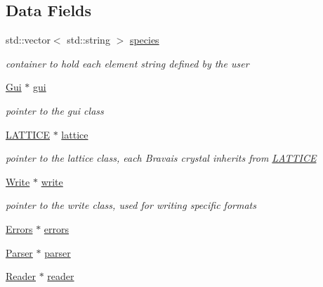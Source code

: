 \subsection*{Data Fields}
\begin{DoxyCompactItemize}
\item 
std\+::vector$<$ std\+::string $>$ \hyperlink{class_i_n_t_e_r_f_a_c_e_aa55e1e42a1d2309638398bb640fbf74f}{species}
\begin{DoxyCompactList}\small\item\em container to hold each element string defined by the user \end{DoxyCompactList}\item 
\hyperlink{class_gui}{Gui} $\ast$ \hyperlink{class_i_n_t_e_r_f_a_c_e_a194a3b0540d87580158795d6a15d916e}{gui}
\begin{DoxyCompactList}\small\item\em pointer to the gui class \end{DoxyCompactList}\item 
\hyperlink{class_l_a_t_t_i_c_e}{L\+A\+T\+T\+I\+C\+E} $\ast$ \hyperlink{class_i_n_t_e_r_f_a_c_e_a5e07ee2e9ab4f84a9a6ae25c023dc24b}{lattice}
\begin{DoxyCompactList}\small\item\em pointer to the lattice class, each Bravais crystal inherits from \hyperlink{class_l_a_t_t_i_c_e}{L\+A\+T\+T\+I\+C\+E} \end{DoxyCompactList}\item 
\hyperlink{class_write}{Write} $\ast$ \hyperlink{class_i_n_t_e_r_f_a_c_e_a6e215284876b2bb79090fd3a210a40b0}{write}
\begin{DoxyCompactList}\small\item\em pointer to the write class, used for writing specific formats \end{DoxyCompactList}\item 
\hyperlink{class_errors}{Errors} $\ast$ \hyperlink{class_i_n_t_e_r_f_a_c_e_aeff8d391b9df980974a10c25b7667b33}{errors}
\item 
\hyperlink{class_parser}{Parser} $\ast$ \hyperlink{class_i_n_t_e_r_f_a_c_e_a71e1361007b1049a1c0012e4e72a672b}{parser}
\item 
\hyperlink{class_reader}{Reader} $\ast$ \hyperlink{class_i_n_t_e_r_f_a_c_e_a0b2f7b62040ca212b71dc2dbc9f8729a}{reader}
\end{DoxyCompactItemize}
